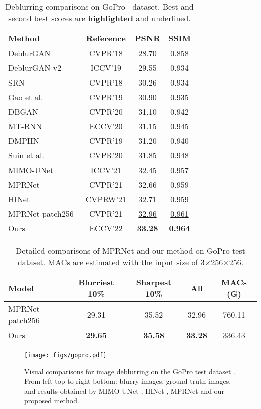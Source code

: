 \documentclass[runningheads]{llncs}
\begin{document}
 
\begin{table}[t]
\centering

\begin{tabular}{l|ccc}
\hline

Method & Reference & PSNR & SSIM\\
\hline
DeblurGAN~\cite{kupyn2018deblurgan}& CVPR'18 & 28.70 & 0.858\\
DeblurGAN-v2~\cite{kupyn2019deblurgan} & ICCV'19 & 29.55 & 0.934\\
SRN~\cite{tao2018srndeblur} & CVPR'18 & 30.26 & 0.934\\
Gao et al.~\cite{gao2019dynamic} & CVPR'19 & 30.90 & 0.935\\
DBGAN~\cite{zhang2020deblurring} & CVPR'20 & 31.10 & 0.942\\
MT-RNN~\cite{park2020multi} & ECCV'20 & 31.15 & 0.945\\
DMPHN~\cite{deepstacked} & CVPR'19 & 31.20 & 0.940\\
Suin et al.~\cite{suin2020spatially} & CVPR'20 & 31.85 & 0.948\\
MIMO-UNet~\cite{MIMO_UNet} & ICCV'21 & 32.45 & 0.957 \\
MPRNet~\cite{Zamir2021MPRNet} & CVPR'21 & 32.66 & 0.959 \\
HINet~\cite{HINet} & CVPRW'21 & 32.71 & 0.959 \\
MPRNet-patch256~\cite{Zamir2021MPRNet} & CVPR'21 & \underline{32.96} & \underline{0.961} \\ 
\hline
Ours & ECCV'22 &\textbf{33.28} & \textbf{0.964}\\
\hline
\end{tabular}
\caption{Deblurring comparisons on GoPro~\cite{deblur-multi-scale} dataset. Best and second best scores are \textbf{highlighted} and \underline{underlined}.}
\label{tb:gopro}
\end{table} \begin{table}[t]
\centering
		\setlength{\tabcolsep}{2pt}
		\begin{tabular}{l|c|c|c|c}
			\hline
			Model & Blurriest 10\% & Sharpest 10\% & All & MACs (G) \\  \hline 
			MPRNet-patch256 \cite{Zamir2021MPRNet} & 29.31 & 35.52 & 32.96 & 760.11 \\ \hline
			Ours & \textbf{29.65} & \textbf{35.58} & \textbf{33.28} & 336.43 \\ \hline
		\end{tabular}
	\caption{Detailed comparisons of MPRNet \cite{Zamir2021MPRNet} and our method on GoPro test dataset\cite{deblur-multi-scale}. MACs are estimated with the input size of 3$\times$256$\times$256. }
	\label{tb:macs}
\end{table} \begin{figure*}[t]
  \centering
   \texttt{[image: figs/gopro.pdf]}
   \caption{Visual comparisons for image deblurring on the GoPro test dataset \cite{deblur-multi-scale}. From left-top to right-bottom: blurry images, ground-truth images, and results obtained by MIMO-UNet \cite{MIMO_UNet}, HINet \cite{HINet}, MPRNet \cite{Zamir2021MPRNet} and our proposed method.}
   \label{fig:gopro_pics}
\end{figure*}
\end{document}
